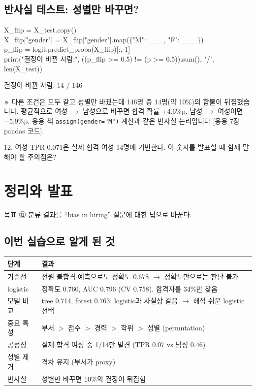 \documentclass[11pt,a4paper]{article}
\newcommand{\code}[1]{\texttt{#1}}
\newcommand{\aside}[1]{{\footnotesize\color{black!65}#1}}
\begin{document}
\subsection{반사실 테스트: 성별만 바꾸면?}
\begin{codebox}
X\_flip = X\_test.copy()\\
X\_flip["gender"] = X\_flip["gender"].map(\{"M": \_\_\_, "F": \_\_\_\})\\
p\_flip = logit.predict\_proba(X\_flip)[:, 1]\\
print("결정이 바뀐 사람:", ((p\_flip >= 0.5) != (p >= 0.5)).sum(), "/", len(X\_test))
\end{codebox}
\begin{outbox}
결정이 바뀐 사람: 14 / 146
\end{outbox}
\aside{※ 다른 조건은 모두 같고 성별만 바꿨는데 146명 중 14명(약 10\%)의 합불이 뒤집혔습니다. 평균적으로 여성 $\to$ 남성으로 바꾸면 합격 확률 +4.6\%p, 남성 $\to$ 여성이면 $-5.9$\%p. 응용 책 \code{assign(gender="M")} 계산과 같은 반사실 논리입니다 [응용 7장 pandas 코드].}

\begin{qbox}
12. 여성 TPR 0.071은 실제 합격 여성 14명에 기반한다. 이 숫자를 발표할 때 함께 말해야 할 주의점은?
\end{qbox}

\section{정리와 발표}
\begin{goalbox}{목표 \quad ⑫}
분류 결과를 ``bias in hiring'' 질문에 대한 답으로 바꾼다.
\end{goalbox}

\subsection{이번 실습으로 알게 된 것}
\begin{center}\small
\begin{tabular}{@{}l p{11cm}@{}}
\toprule
단계 & 결과 \\
\midrule
기준선 & 전원 불합격 예측으로도 정확도 0.678 $\to$ 정확도만으로는 판단 불가 \\
logistic & 정확도 0.760, AUC 0.796 (CV 0.758). 합격자를 34\%만 찾음 \\
모델 비교 & tree 0.714, forest 0.763: logistic과 사실상 같음 $\to$ 해석 쉬운 logistic 선택 \\
중요 특성 & 부서 $>$ 점수 $>$ 경력 $>$ 학위 $>$ 성별 (permutation) \\
공정성 & 실제 합격 여성 중 1/14만 발견 (TPR 0.07 vs 남성 0.46) \\
성별 제거 & 격차 유지 (부서가 proxy) \\
반사실 & 성별만 바꾸면 10\%의 결정이 뒤집힘 \\
\bottomrule
\end{tabular}
\end{center}
\end{document}
